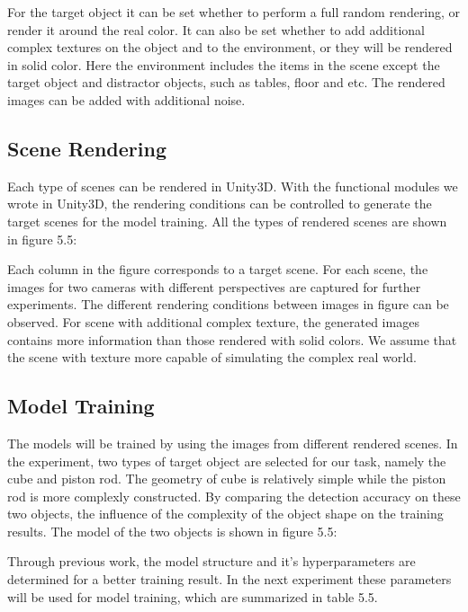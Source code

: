 For the target object it can be set whether to perform a full random rendering, or render it around the real color. It can also be set whether to add additional complex textures on the object and to the environment, or they will be rendered in solid color. Here the environment includes the items in the scene except the target object and distractor objects, such as tables, floor and etc. The rendered images can be added with additional noise.


\subsection{Scene Rendering}
Each type of scenes can be rendered in Unity3D. With the functional modules we wrote in Unity3D, the rendering conditions can be controlled to generate the target scenes for the model training. All the  types of rendered scenes are shown in figure 5.5:
 \missingfigure{}
 
 Each column in the figure corresponds to a target scene. For each scene, the images for two cameras with different perspectives are captured for further experiments. The different rendering conditions between images in figure can be observed. For scene with additional complex texture, the generated images contains more information than those rendered with solid colors. We assume that the scene with texture more capable of simulating the complex real world. 
 
\subsection{Model Training}
The models will be trained by using the images from different rendered scenes. In the experiment, two types of target object are selected for our task, namely the cube and piston rod. The geometry of cube is relatively simple while the piston rod is more complexly constructed. By comparing the detection accuracy on these two objects, the influence of the complexity of the object shape on the training results. The model of the two objects is shown in figure 5.5:

\missingfigure{}

Through previous work, the model structure and it's hyperparameters are determined for a better training result. In the next experiment these parameters will be used for model training, which are summarized in table 5.5.

